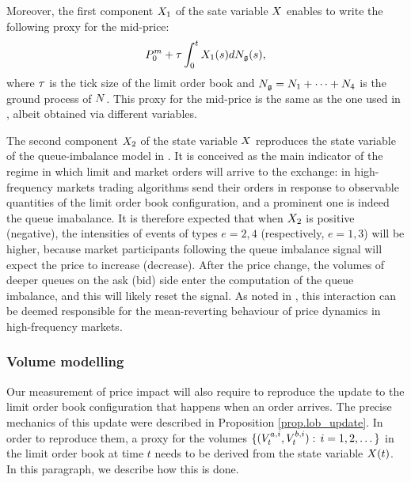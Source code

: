 \documentclass[10pt]{article}
\begin{document}
Moreover, the first component $\stateVariable_1$ of the sate variable $\stateVariable$ enables to write the following proxy for the mid-price:
\begin{equation*}
 \midprice_0 + \tickSizeOfLOB \intzerot \stateVariable_1(s) d\groundProc(s),
\end{equation*}
where $\tickSizeOfLOB$ is the tick size of the limit order book and $\groundProc = \countingProc[1] + \dots + \countingProc[4]$ is the ground process of $\multiCountingProc$. This proxy for the mid-price  is the same as the one used in \citealp{BM14haw}, albeit obtained via different variables. 

The second component $\stateVariable_2$ of the state variable $\stateVariable$ reproduces the state variable of the queue-imbalance model in \citealp{MP18sta}. It is conceived as the main indicator of the regime in which limit and market orders will arrive to the exchange: in high-frequency markets trading algorithms send their orders in response to observable quantities of the limit order book configuration, and a prominent one is indeed the queue imabalance. It is therefore expected that when $\stateVariable_2$ is positive (negative), the intensities of events of types $e=2,4$ (respectively, $e=1,3$) will be higher, because market participants following the queue imbalance signal will expect the price to increase (decrease). After the price change,  the volumes of deeper queues on the ask (bid) side enter the computation of the queue imbalance, and this will likely reset the signal.  As noted in \citealp{MP18sta}, this interaction can be deemed responsible for the mean-reverting behaviour of price dynamics in high-frequency markets. 


\subsubsection{Volume modelling}
Our measurement of price impact will also require to reproduce the update to the limit order book configuration that happens when an order arrives. The precise mechanics of this update were described in Proposition \ref{prop.lob_update}. In order to reproduce them, a proxy for the volumes $\lbrace (\nthBestAskVolume[i]_t, \nthBestBidVolume[i]_t): \, i=1,2,\dots\rbrace$ in the limit order book at time $t$ needs to be derived from the state variable $\stateVariable(t)$. In this paragraph, we describe how this is done. 
\end{document}
